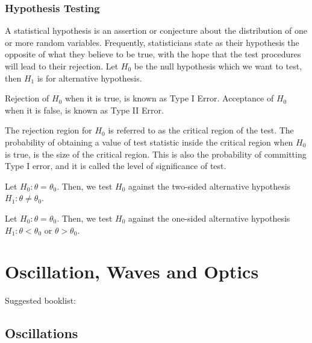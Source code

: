 \documentclass[a4paper]{article}
\begin{document}
\subsubsection*{Hypothesis Testing~\cite{ross2010first}}
\begin{defi}[Hypothesis]
A statistical hypothesis is an assertion or conjecture about the distribution of one or more random variables. Frequently, statisticians state as their hypothesis the opposite of what they believe to be true, with the hope that the test procedures will lead to their rejection. Let $H_0$ be the null hypothesis which we want to test, then $H_1$ is for alternative hypothesis. 
\end{defi}
\begin{defi}[Error]
Rejection of $H_0$ when it is true, is known as Type I Error. Acceptance of $H_0$ when it is false, is known as Type II Error.
\end{defi}
\begin{defi}
The rejection region for $H_0$ is referred to as the critical region of the test. The probability of obtaining a value of test statistic inside the critical region when $H_0$ is true, is the size of the critical region. This is also the probability of committing Type I error, and it is called the level of significance of test.
\end{defi}
\begin{defi}
Let $H_0:\theta=\theta_0$. Then, we test $H_0$ against the two-sided alternative hypothesis $H_1:\theta\neq\theta_0$.
\end{defi}
\begin{defi}
Let $H_0:\theta=\theta_0$. Then, we test $H_0$ against the one-sided alternative hypothesis $H_1:\theta<\theta_0$ or $\theta>\theta_0$.
\end{defi}
\newpage
\section{Oscillation, Waves and Optics}
Suggested booklist: \cite{pain2015introduction}
\subsection{Oscillations}
\end{document}
